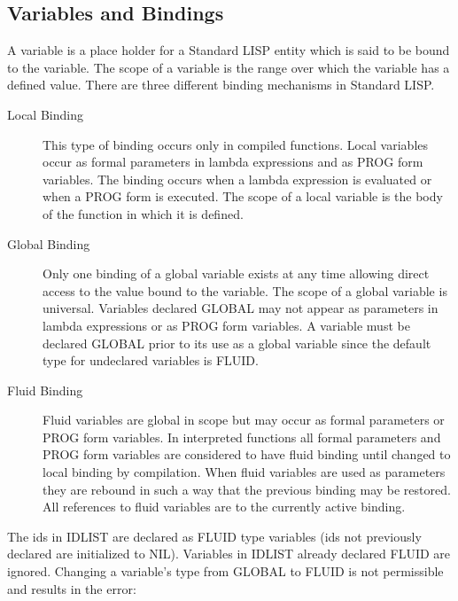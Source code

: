 \documentclass[11pt,letterpaper]{book}
\begin{document}
\subsection{Variables and Bindings}
\label{varsandbinds}
 
A variable is a place holder for a Standard LISP entity which is said
to be bound to the variable. The scope of a variable is the range over
which the variable has a defined value. There are three different
binding mechanisms in Standard LISP.

\begin{description}
\item[Local Binding]  This type of binding occurs
only in compiled functions. Local variables occur as formal parameters
in lambda expressions and as PROG form variables. The binding occurs
when a lambda expression is evaluated or when a PROG form is executed.
The scope of a local variable is the body of the function in which it
is defined.

\item[Global Binding]  Only one binding of a
global variable exists at any time allowing direct access to the value
bound to the variable.  The scope of a global variable is universal.
Variables declared GLOBAL may not appear as parameters in lambda
expressions or as PROG form variables. A variable must be declared
GLOBAL prior to its use as a global variable since the default type
for undeclared variables is FLUID.


\item[Fluid Binding] 
 Fluid variables are global
in scope but may occur as  formal parameters or
PROG form variables. In interpreted functions all formal parameters
and PROG form variables are considered to have fluid binding until
changed to local binding by compilation.  When fluid variables are
used as parameters they are rebound in such a way that the previous
binding may be restored. All references to fluid variables are to the
currently active binding.
\end{description}


{The ids in IDLIST are declared as FLUID type variables (ids not
previously declared are initialized to NIL). Variables in IDLIST
already declared FLUID are ignored. Changing a variable's type from
GLOBAL to FLUID is not permissible and results in the error:

}
\end{document}
